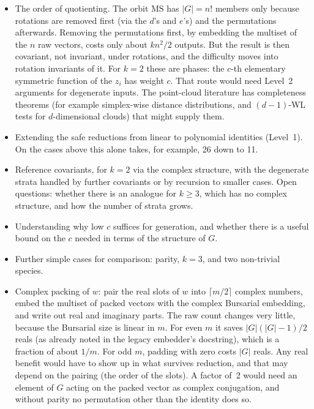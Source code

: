 \documentclass[11pt]{article}
\theoremstyle{definition}
\theoremstyle{remark}
\newcommand{\MS}{\mathrm{MS}}
\begin{document}
\begin{itemize}
  \item The order of quotienting. The orbit $\MS$ has $|G| = n!$ members only
    because rotations are removed first (via the $d$'s and $e$'s) and the
    permutations afterwards. Removing the permutations first, by embedding the
    multiset of the $n$ raw vectors, costs only about $k n^2/2$ outputs. But
    the result is then covariant, not invariant, under rotations, and the
    difficulty moves into rotation invariants of it. For $k = 2$ these are
    phases: the $c$-th elementary symmetric function of the $z_i$ has weight
    $c$. That route would need Level~2 arguments for degenerate inputs. The
    point-cloud literature has completeness theorems (for example
    simplex-wise distance distributions, and $(d-1)$-WL tests for
    $d$-dimensional clouds) that might supply them.
  \item Extending the safe reductions from linear to polynomial identities
    (Level~1). On the cases above this alone takes, for example, 26 down to
    11.
  \item Reference covariants, for $k = 2$ via the complex structure, with the
    degenerate strata handled by further covariants or by recursion to smaller
    cases. Open questions: whether there is an analogue for $k \ge 3$, which
    has no complex structure, and how the number of strata grows.
  \item Understanding why low $c$ suffices for generation, and whether there is
    a useful bound on the $c$ needed in terms of the structure of $G$.
  \item Further simple cases for comparison: parity, $k = 3$, and two
    non-trivial species.
  \item Complex packing of $w$: pair the real slots of $w$ into
    $\lceil m/2 \rceil$ complex numbers, embed the multiset of packed vectors
    with the complex Bursarial embedding, and write out real and imaginary
    parts. The raw count changes very little, because the Bursarial size is
    linear in $m$. For even $m$ it saves $|G|(|G|-1)/2$ reals (as already
    noted in the legacy embedder's docstring), which is a fraction of
    about $1/m$. For odd $m$, padding with zero costs $|G|$ reals. Any real
    benefit would have to show up in what survives reduction, and that may
    depend on the pairing (the order of the slots). A factor of~2 would need an
    element of $G$ acting on the packed vector as complex conjugation, and
    without parity no permutation other than the identity does so.

\end{itemize}
\end{document}
